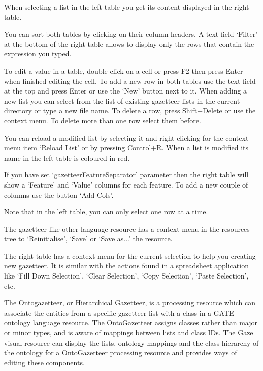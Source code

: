 When selecting a list in the left table you get its content displayed in the
right table.

You can sort both tables by clicking on their column headers. A text field
`Filter' at the bottom of the right table allows to display only the rows
that contain the expression you typed.

To edit a value in a table, double click on a cell or press F2 then press
Enter when finished editing the cell. To add a new row in both tables use
the text field at the top and press Enter or use the `New' button next to
it. When adding a new list you can select from the list of existing
gazetteer lists in the current directory or type a new file name. To delete
a row, press Shift+Delete or use the context menu. To delete more than one
row select them before.

You can reload a modified list by selecting it and right-clicking for the
context menu item `Reload List' or by pressing Control+R. When a list is
modified its name in the left table is coloured in red.

If you have set `gazetteerFeatureSeparator' parameter then the right table
will show a `Feature' and `Value' columns for each feature. To add a new
couple of columns use the button `Add Cols'.

Note that in the left table, you can only select one row at a time.

The gazetteer like other language resource has a context menu in the
resources tree to `Reinitialise', `Save' or `Save as...' the resource.

The right table has a context menu for the current selection to help you
creating new gazetteer. It is similar with the actions found in a
spreadsheet application like `Fill Down Selection', `Clear Selection', `Copy
Selection', `Paste Selection', etc.


The Ontogazetteer, or Hierarchical Gazetteer, is a processing resource which
can associate the entities from a specific gazetteer list with a class
in a GATE ontology language resource.  
The OntoGazetteer assigns classes rather than major or
minor types, and is aware of mappings between lists and class
IDs. The Gaze visual resource can display the lists, ontology mappings and 
the class hierarchy of the ontology for a OntoGazetteer processing resource 
and provides ways of editing these components.

